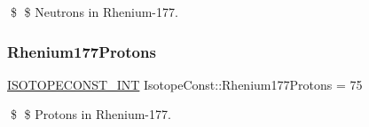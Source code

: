 \$ \$ Neutrons in Rhenium-\/177. \mbox{\label{group___isotope_const-_rhenium-_re177_ga3600c9d4a13e6fa1ff501676baf34de5}} 
\subsubsection{\texorpdfstring{Rhenium177\+Protons}{Rhenium177Protons}}
{\footnotesize\ttfamily \mbox{\hyperlink{group___isotope_const-_macros_ga5f18360b3e99483a35c32d789e62621c}{I\+S\+O\+T\+O\+P\+E\+C\+O\+N\+S\+T\+\_\+\+I\+NT}} Isotope\+Const\+::\+Rhenium177\+Protons = 75}

\$ \$ Protons in Rhenium-\/177. 